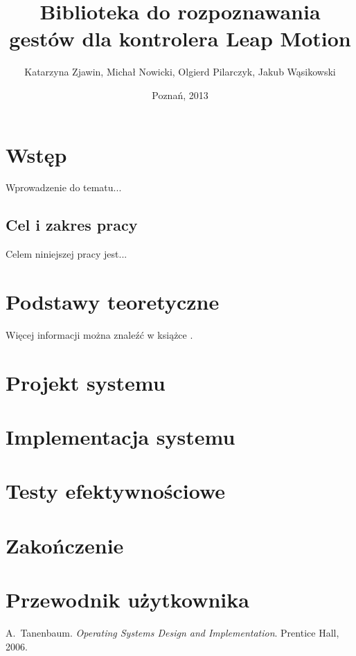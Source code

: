 \documentclass[11pt,a4paper,polish,thesis]{dcsbook}
\begin{document}
\author{Katarzyna Zjawin, Michał Nowicki, Olgierd Pilarczyk, Jakub Wąsikowski}
\title{Biblioteka do rozpoznawania gestów dla kontrolera Leap Motion}
\date{Poznań, 2013}
\maketitle
\frontmatter
\tableofcontents{}
\mainmatter

\chapter{Wstęp}

Wprowadzenie do tematu...

\section*{Cel i zakres pracy}

Celem niniejszej pracy jest...

\chapter{Podstawy teoretyczne}

Więcej informacji można znaleźć w książce \cite{sop}.

\chapter{Projekt systemu}

\chapter{Implementacja systemu}

\chapter{Testy efektywnościowe}

\chapter{Zakończenie}

\appendix

\chapter{Przewodnik użytkownika}

\backmatter

\begin{thebibliography}{1}
A.~Tanenbaum. \emph{Operating Systems Design and Implementation}.
Prentice Hall, 2006.
\end{thebibliography}
\end{document}
